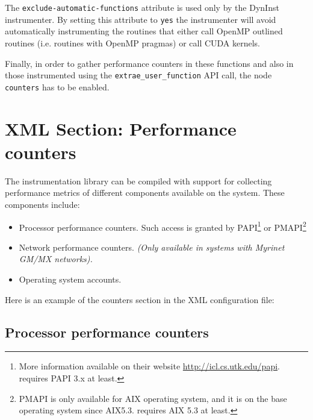 The {\tt exclude-automatic-functions} attribute is used only by the DynInst instrumenter. By setting this attribute to {\tt yes} the instrumenter will avoid automatically instrumenting the routines that either call OpenMP outlined routines (i.e. routines with OpenMP pragmas) or call CUDA kernels.

Finally, in order to gather performance counters in these functions and also in those instrumented using the {\tt extrae\_user\_function} API call, the node {\tt counters} has to be enabled.


\section{XML Section: Performance counters}\label{sec:XMLSectionPerformanceCounters}

The instrumentation library can be compiled with support for collecting performance metrics of different components available on the system. These components include:

\begin{itemize}
 \item Processor performance counters. Such access is granted by PAPI\footnote{More information available on their website \url{http://icl.cs.utk.edu/papi}. \TRACE requires PAPI 3.x at least.} or PMAPI\footnote{PMAPI is only available for AIX operating system, and it is on the base operating system since AIX5.3. \TRACE requires AIX 5.3 at least.}
 \item Network performance counters. {\em (Only available in systems with Myrinet GM/MX networks).}
 \item Operating system accounts.
\end{itemize}

Here is an example of the counters section in the XML configuration file:




\subsection{Processor performance counters}\label{subsec:ProcessorPerformanceCounters}


